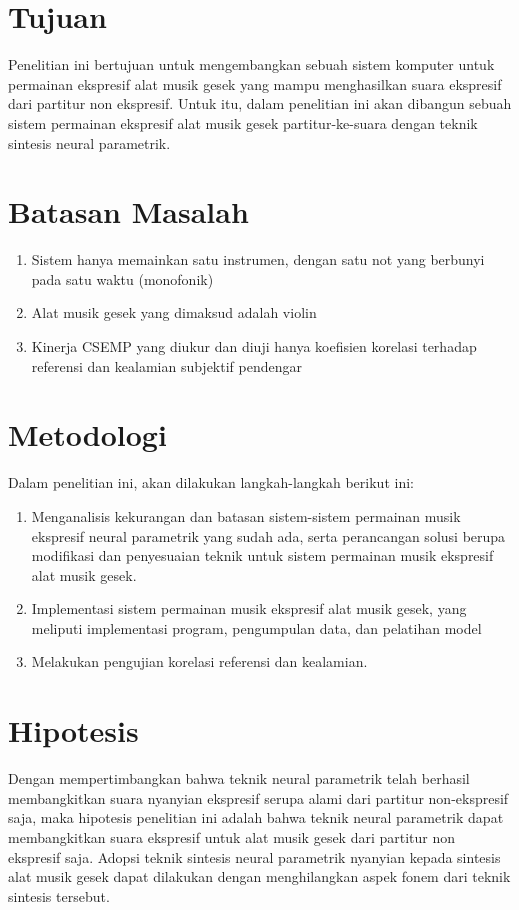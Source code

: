 \section{Tujuan}

Penelitian ini bertujuan untuk mengembangkan sebuah sistem komputer untuk permainan ekspresif alat musik gesek yang mampu menghasilkan suara ekspresif dari partitur non ekspresif. Untuk itu, dalam penelitian ini akan dibangun sebuah sistem permainan ekspresif alat musik gesek partitur-ke-suara dengan teknik sintesis neural parametrik.

\section{Batasan Masalah}

\begin{enumerate}
	\item Sistem hanya memainkan satu instrumen, dengan satu not yang berbunyi pada satu waktu (monofonik)
	\item Alat musik gesek yang dimaksud adalah violin
	\item Kinerja CSEMP yang diukur dan diuji hanya koefisien korelasi terhadap referensi dan kealamian subjektif pendengar
\end{enumerate}

\section{Metodologi} \label{methodology}

Dalam penelitian ini, akan dilakukan langkah-langkah berikut ini:
\begin{enumerate}
	\item Menganalisis kekurangan dan batasan sistem-sistem permainan musik ekspresif neural parametrik yang sudah ada, serta perancangan solusi berupa modifikasi dan penyesuaian teknik untuk sistem permainan musik ekspresif alat musik gesek.
	\item Implementasi sistem permainan musik ekspresif alat musik gesek, yang meliputi implementasi program, pengumpulan data, dan pelatihan model
	\item Melakukan pengujian korelasi referensi dan kealamian.
\end{enumerate}

\section{Hipotesis}

Dengan mempertimbangkan bahwa teknik neural parametrik telah berhasil membangkitkan suara nyanyian ekspresif serupa alami dari partitur non-ekspresif saja, maka hipotesis penelitian ini adalah bahwa teknik neural parametrik dapat membangkitkan suara ekspresif untuk alat musik gesek dari partitur non ekspresif saja. Adopsi teknik sintesis neural parametrik nyanyian kepada sintesis alat musik gesek dapat dilakukan dengan menghilangkan aspek fonem dari teknik sintesis tersebut.
